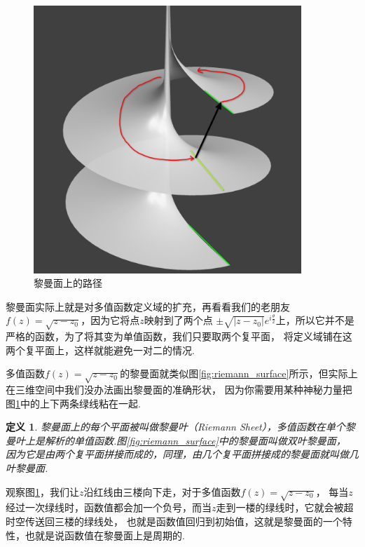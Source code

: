 \documentclass[12pt, a4paper]{ctexbook}
\newtheorem{definition}{定义}[chapter] %
\begin{document}
\begin{figure}[htbp]
\begin{minipage}[t]{0.48\textwidth}
                        \includegraphics[width=0.9\textwidth]{RiemannSurfacePainted.png}
                        \caption{黎曼面上的路径}
                        \label{fig:riemann_surface_painted}
                    \end{minipage}
                \end{figure}

                黎曼面实际上就是对多值函数定义域的扩充，再看看我们的老朋友$f(z) = \sqrt{z - z_0}$，因为它将点$z$映射到了两个点
                $\pm \sqrt{|z - z_0|}e^{i\frac{\theta}{2}}$上，所以它并不是严格的函数，为了将其变为单值函数，我们只要取两个复平面，
                将定义域铺在这两个复平面上，这样就能避免一对二的情况.

                多值函数$f(z) = \sqrt{z - z_0}$的黎曼面就类似图\ref{fig:riemann_surface}所示，但实际上在三维空间中我们没办法画出黎曼面的准确形状，
                因为你需要用某种神秘力量把图\ref{fig:riemann_surface_painted}中的上下两条绿线粘在一起.

                \begin{definition}
                    黎曼面上的每个平面被叫做黎曼叶（Riemann Sheet），多值函数在单个黎曼叶上是解析的单值函数.图\ref{fig:riemann_surface}中的黎曼面叫做双叶黎曼面，
                    因为它是由两个复平面拼接而成的，同理，由几个复平面拼接成的黎曼面就叫做几叶黎曼面.
                \end{definition}

                观察图\ref{fig:riemann_surface_painted}，我们让$z$沿红线由三楼向下走，对于多值函数$f(z) = \sqrt{z - z_0}$，
                每当$z$经过一次绿线时，函数值都会加一个负号，而当$z$走到一楼的绿线时，它就会被超时空传送回三楼的绿线处，
                也就是函数值回归到初始值，这就是黎曼面的一个特性，也就是说函数值在黎曼面上是周期的.
\end{document}

